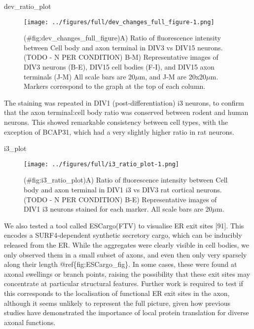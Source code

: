 \documentclass[
  12pt,
  a4paper,
]{book}
\newenvironment{Shaded}{\begin{snugshade}}{\end{snugshade}}
\newcommand{\NormalTok}[1]{#1}
\begin{document}
\begin{Shaded}
\begin{Highlighting}[]
\NormalTok{dev\_ratio\_plot}
\end{Highlighting}
\end{Shaded}

\begin{figure}
\centering
\texttt{[image: ../figures/full/dev\_changes\_full\_figure-1.png]}
\caption{(\#fig:dev\_changes\_full\_figure)A) Ratio of fluorescence intensity between Cell body and axon terminal in DIV3 vs DIV15 neurons. (TODO - N PER CONDITION) B-M) Representative images of DIV3 neurons (B-E), DIV15 cell bodies (F-I), and DIV15 axon terminals (J-M) All scale bars are 20\(\mu\)m, and J-M are 20x20\(\mu\)m. Markers correspond to the graph at the top of each column.}
\end{figure}

The staining was repeated in DIV1 (post-differentiation) i3 neurons, to confirm that the axon terminal:cell body ratio was conserved between rodent and human neurons. This showed remarkable consistency between cell types, with the exception of BCAP31, which had a very slightly higher ratio in rat neurons.

\begin{Shaded}
\begin{Highlighting}[]
\NormalTok{i3\_plot}
\end{Highlighting}
\end{Shaded}

\begin{figure}
\centering
\texttt{[image: ../figures/full/i3\_ratio\_plot-1.png]}
\caption{(\#fig:i3\_ratio\_plot)A) Ratio of fluorescence intensity between Cell body and axon terminal in DIV1 i3 vs DIV3 rat cortical neurons. (TODO - N PER CONDITION) B-E) Representative images of DIV1 i3 neurons stained for each marker. All scale bars are 20\(\mu\)m.}
\end{figure}

We also tested a tool called ESCargo(FTV) to visualise ER exit sites {[}91{]}. This encodes a SURF4-dependent synthetic secretory cargo, which can be inducibly released from the ER. While the aggregates were clearly visible in cell bodies, we only observed them in a small subset of axons, and even then only very sparsely along their length @ref\{fig:ESCargo\_fig\}. In some cases, these were found at axonal swellings or branch points, raising the possibility that these exit sites may concentrate at particular structural features. Further work is required to test if this corresponds to the localisation of functional ER exit sites in the axon, although it seems unlikely to represent the full picture, given how previous studies have demonstrated the importance of local protein translation for diverse axonal functions.
\end{document}
